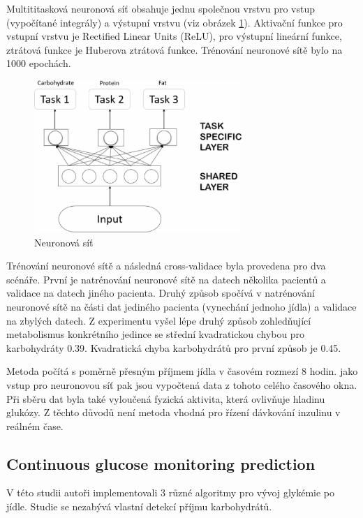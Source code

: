 Multititasková neuronová síť obsahuje jednu společnou vrstvu pro vstup (vypočítané integrály) a výstupní vrstvu (viz obrázek \ref{fig:neuronka}). Aktivační funkce pro vstupní vrstvu je Rectified Linear Units (ReLU), pro výstupní lineární funkce, ztrátová funkce je Huberova ztrátová funkce. Trénování neuronové sítě bylo na 1000 epochách.

\begin{figure}[H]
\caption{Neuronová síť}
\label{fig:neuronka}
\centering
\includegraphics[width=0.7\textwidth]{img/analyza/neuronka.png}
\end{figure}

Trénování neuronové sítě a následná cross-validace byla provedena pro dva scénáře. První je natrénování neuronové sítě na datech několika pacientů a validace na datech jiného pacienta. Druhý způsob spočívá v natrénování neuronové sítě na části dat jediného pacienta (vynechání jednoho jídla) a validace na zbylých datech. Z experimentu vyšel lépe druhý způsob zohledňující metabolismus konkrétního jedince se střední kvadratickou chybou pro karbohydráty 0.39. Kvadratická chyba karbohydrátů pro první způsob je 0.45. 

Metoda počítá s poměrně přesným příjmem jídla v časovém rozmezí 8 hodin. jako vstup pro neuronovou síť pak jsou vypočtená data z tohoto celého časového okna. Při sběru dat byla také vyloučená fyzická aktivita, která ovlivňuje hladinu glukózy. Z těchto důvodů není metoda vhodná pro řízení dávkování inzulinu v reálném čase.


\subsection{Continuous glucose monitoring prediction \citep{Analyza.LSTM}}

V této studii autoři implementovali 3 různé algoritmy pro vývoj glykémie po jídle. Studie se nezabývá vlastní detekcí příjmu karbohydrátů.

